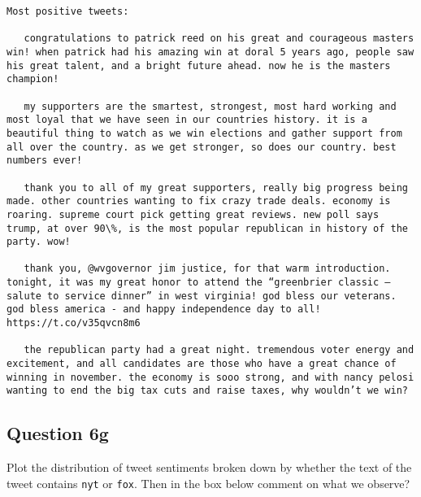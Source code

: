 \documentclass[11pt]{article}
\begin{document}
    \begin{Verbatim}[commandchars=\\\{\}]
Most positive tweets:

   congratulations to patrick reed on his great and courageous masters win! when patrick had his amazing win at doral 5 years ago, people saw his great talent, and a bright future ahead. now he is the masters champion!

   my supporters are the smartest, strongest, most hard working and most loyal that we have seen in our countries history. it is a beautiful thing to watch as we win elections and gather support from all over the country. as we get stronger, so does our country. best numbers ever!

   thank you to all of my great supporters, really big progress being made. other countries wanting to fix crazy trade deals. economy is roaring. supreme court pick getting great reviews. new poll says trump, at over 90\%, is the most popular republican in history of the party. wow!

   thank you, @wvgovernor jim justice, for that warm introduction. tonight, it was my great honor to attend the “greenbrier classic – salute to service dinner” in west virginia! god bless our veterans. god bless america - and happy independence day to all! https://t.co/v35qvcn8m6

   the republican party had a great night. tremendous voter energy and excitement, and all candidates are those who have a great chance of winning in november. the economy is sooo strong, and with nancy pelosi wanting to end the big tax cuts and raise taxes, why wouldn’t we win?

    \end{Verbatim}

    \subsection{Question 6g}\label{question-6g}

Plot the distribution of tweet sentiments broken down by whether the
text of the tweet contains \texttt{nyt} or \texttt{fox}. Then in the box
below comment on what we observe?
\end{document}
